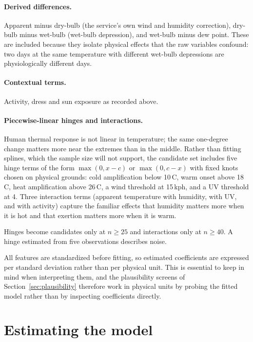 \documentclass[11pt]{article}
\begin{document}
\paragraph{Derived differences.} Apparent minus dry-bulb (the service's own
wind and humidity correction), dry-bulb minus wet-bulb (wet-bulb depression),
and wet-bulb minus dew point. These are included because they isolate physical
effects that the raw variables confound: two days at the same temperature with
different wet-bulb depressions are physiologically different days.

\paragraph{Contextual terms.} Activity, dress and sun exposure as recorded
above.

\paragraph{Piecewise-linear hinges and interactions.} Human thermal response is
not linear in temperature; the same one-degree change matters more near the
extremes than in the middle. Rather than fitting splines, which the sample size
will not support, the candidate set includes five hinge terms of the form
$\max(0, x - c)$ or $\max(0, c - x)$ with fixed knots chosen on physical
grounds: cold amplification below 10\,\textdegree C, warm onset above
18\,\textdegree C, heat amplification above 26\,\textdegree C, a wind threshold
at 15\,kph, and a UV threshold at 4. Three interaction terms (apparent
temperature with humidity, with UV, and with activity) capture the familiar
effects that humidity matters more when it is hot and that exertion matters
more when it is warm.

Hinges become candidates only at $n \geq 25$ and interactions only at
$n \geq 40$. A hinge estimated from five observations describes noise.

All features are standardized before fitting, so estimated coefficients are
expressed per standard deviation rather than per physical unit. This is
essential to keep in mind when interpreting them, and the plausibility screens
of Section~\ref{sec:plausibility} therefore work in physical units by probing
the fitted model rather than by inspecting coefficients directly.

\section{Estimating the model}
\label{sec:fitting}
\end{document}
